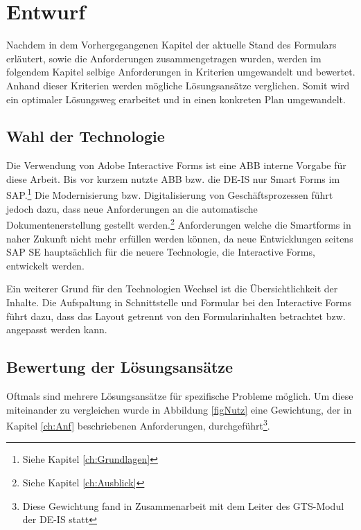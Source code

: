\chapter{Entwurf}

Nachdem in dem Vorhergegangenen Kapitel der aktuelle Stand des Formulars erläutert, sowie die Anforderungen zusammengetragen wurden, werden im folgendem Kapitel selbige Anforderungen in Kriterien umgewandelt und bewertet. Anhand dieser Kriterien werden mögliche Lösungsansätze verglichen. Somit wird ein optimaler Lösungsweg erarbeitet und in einen konkreten Plan umgewandelt.

\section{Wahl der Technologie}
\label{ch:Techn}

Die Verwendung von Adobe Interactive Forms ist eine ABB interne Vorgabe für diese Arbeit. Bis vor kurzem nutzte ABB bzw. die DE-IS nur Smart Forms im SAP.\footnote{Siehe Kapitel \ref{ch:Grundlagen}} Die Modernisierung bzw. Digitalisierung von Geschäftsprozessen führt jedoch dazu, dass neue Anforderungen an die automatische Dokumentenerstellung gestellt werden.\footnote{Siehe Kapitel \ref{ch:Ausblick}} Anforderungen welche die Smartforms in naher Zukunft nicht mehr erfüllen werden können, da neue Entwicklungen seitens SAP SE hauptsächlich für die neuere Technologie, die Interactive Forms, entwickelt werden.

Ein weiterer Grund für den Technologien Wechsel ist die Übersichtlichkeit der Inhalte. Die Aufspaltung in Schnittstelle und Formular bei den Interactive Forms führt dazu, dass das Layout getrennt von den Formularinhalten betrachtet bzw. angepasst werden kann. 


\section{Bewertung der Lösungsansätze}
\label{ch:Bewertung}

Oftmals sind mehrere Lösungsansätze für spezifische Probleme möglich. Um diese miteinander zu vergleichen wurde in Abbildung \ref{figNutz} eine Gewichtung, der in Kapitel \ref{ch:Anf} beschriebenen Anforderungen, durchgeführt\footnote{Diese Gewichtung fand in Zusammenarbeit mit dem  Leiter des GTS-Modul  der DE-IS statt}. 

